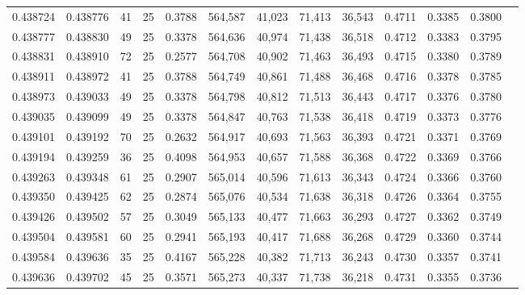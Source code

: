 \begin{tabular}{rrrrrrrrrrrrr}
0.438724 & 0.438776 &    41 &  25 &                                     0.3788 & 564,587 &  41,023 &  71,413 &  36,543 & 0.4711 & 0.3385 & 0.3800 \\
0.438777 & 0.438830 &    49 &  25 &                                     0.3378 & 564,636 &  40,974 &  71,438 &  36,518 & 0.4712 & 0.3383 & 0.3795 \\
0.438831 & 0.438910 &    72 &  25 &                                     0.2577 & 564,708 &  40,902 &  71,463 &  36,493 & 0.4715 & 0.3380 & 0.3789 \\
0.438911 & 0.438972 &    41 &  25 &                                     0.3788 & 564,749 &  40,861 &  71,488 &  36,468 & 0.4716 & 0.3378 & 0.3785 \\
0.438973 & 0.439033 &    49 &  25 &                                     0.3378 & 564,798 &  40,812 &  71,513 &  36,443 & 0.4717 & 0.3376 & 0.3780 \\
0.439035 & 0.439099 &    49 &  25 &                                     0.3378 & 564,847 &  40,763 &  71,538 &  36,418 & 0.4719 & 0.3373 & 0.3776 \\
0.439101 & 0.439192 &    70 &  25 &                                     0.2632 & 564,917 &  40,693 &  71,563 &  36,393 & 0.4721 & 0.3371 & 0.3769 \\
0.439194 & 0.439259 &    36 &  25 &                                     0.4098 & 564,953 &  40,657 &  71,588 &  36,368 & 0.4722 & 0.3369 & 0.3766 \\
0.439263 & 0.439348 &    61 &  25 &                                     0.2907 & 565,014 &  40,596 &  71,613 &  36,343 & 0.4724 & 0.3366 & 0.3760 \\
0.439350 & 0.439425 &    62 &  25 &                                     0.2874 & 565,076 &  40,534 &  71,638 &  36,318 & 0.4726 & 0.3364 & 0.3755 \\
0.439426 & 0.439502 &    57 &  25 &                                     0.3049 & 565,133 &  40,477 &  71,663 &  36,293 & 0.4727 & 0.3362 & 0.3749 \\
0.439504 & 0.439581 &    60 &  25 &                                     0.2941 & 565,193 &  40,417 &  71,688 &  36,268 & 0.4729 & 0.3360 & 0.3744 \\
0.439584 & 0.439636 &    35 &  25 &                                     0.4167 & 565,228 &  40,382 &  71,713 &  36,243 & 0.4730 & 0.3357 & 0.3741 \\
0.439636 & 0.439702 &    45 &  25 &                                     0.3571 & 565,273 &  40,337 &  71,738 &  36,218 & 0.4731 & 0.3355 & 0.3736 \\

\end{tabular}

